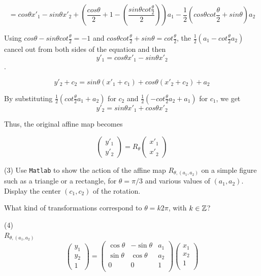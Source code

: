 \documentclass[12pt]{article}
\begin{document}
$$ = cos\theta x'_1  - sin\theta x'_2 + (\frac {cos\theta}{2} + 1 - (\frac{sin\theta cot \frac{\theta}{2}}{2} ))a_1 - \frac{1}{2}(cos\theta cot \frac{\theta}{2} + sin\theta) a_2$$

Using $cos\theta - sin\theta cot \frac{\theta}{2} = -1$ and $cos\theta cot \frac{\theta}{2} + sin\theta = cot \frac{\theta}{2}$, the $\frac{1}{2} (a_1 - cot \frac{\theta}{2}a_2)$ cancel out from both sides of the equation and then $$y'_1 = cos\theta x'_1 - sin\theta x'_2$$.

$$y'_2 + c_2 = sin\theta (x'_1+ c_1) + cos\theta (x'_2 +c_2) + a_2$$

By substituting $\frac{1}{2} \left( cot \frac{\theta}{2} a_1+a_2 \right)$ for $c_2$ and $\frac{1}{2} \left( -cot \frac{\theta}{2} a_2+a_1 \right)$ for $c_1$, we get\\ 

 $$y'_2 = sin\theta x'_1 + cos\theta x'_2$$
 
 Thus, the original affine map becomes 
 
 $$ \begin{pmatrix}y'_1 \\y'_2\end{pmatrix}= R_\theta \begin{pmatrix}x'_1 \\x'_2\end{pmatrix}$$

\medskip
(3)
Use {\tt Matlab} to show the action of  the affine map
$R_{\theta, (a_1,a_2)}$ on a simple figure such as
a triangle or a rectangle,
for $\theta = \pi/3$ and various values of $(a_1, a_2)$.
Display the center $(c_1, c_2)$ of the rotation.

\medskip
What kind of transformations correspond to
$\theta= k 2\pi$, with $k \in \mathbb{Z}$?


\medskip
(4) \\

$R_{\theta, (a_1,a_2)}$ \\
\[
\begin{pmatrix}
y_1 \\
y_2 \\
1
\end{pmatrix}
=
\begin{pmatrix}
\cos\theta & -\sin\theta & a_1 \\
\sin\theta & \cos\theta & a_2 \\
0 & 0 & 1 \\
\end{pmatrix}
\begin{pmatrix}
x_1 \\
x_2 \\
1 \\
\end{pmatrix}
\]
\end{document}
